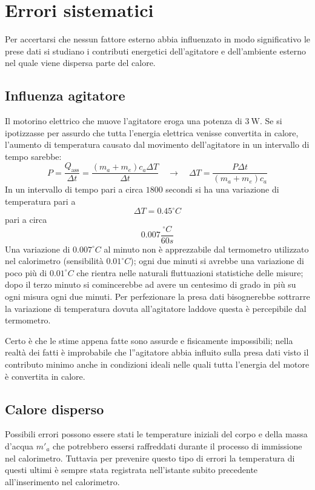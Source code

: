 \documentclass{article}
\begin{document}
	
	
	
	
	\section{Errori sistematici}
	Per accertarsi che nessun fattore esterno abbia influenzato in modo significativo le prese dati si studiano i contributi energetici dell'agitatore e dell'ambiente esterno nel quale viene dispersa parte del calore.
	
	\subsection{Influenza agitatore}
	
	
	Il motorino elettrico che muove l'agitatore eroga una potenza di \(\SI{3}{\watt}\). Se si ipotizzasse per assurdo che tutta l’energia elettrica venisse convertita in calore, l'aumento di temperatura causato dal movimento dell’agitatore in un intervallo di tempo sarebbe:
	\[ 
	P = \frac{Q_{\text{ass}}}{\Delta t} = \frac{(m_{a} + m_{e})c_{a}\Delta T}{\Delta t} \quad \to \quad \Delta T = \frac{P\Delta t}{(m_{a} + m_{e})c_{a}}
	\]
	In un intervallo di tempo pari a circa \(1800\) secondi si ha una variazione di temperatura pari a 
	\[ 
	\Delta T = 0.45 ^\circ C 
	\]
	pari a circa 
	\[
	0.007 \frac{^\circ C}{60 s}
	\]
	Una variazione di \(0.007 ^\circ C\) al minuto non è apprezzabile dal termometro utilizzato nel calorimetro (sensibilità \(0.01^\circ C\)); ogni due minuti si avrebbe una variazione di poco più di \(0.01^\circ C\) che rientra nelle naturali fluttuazioni statistiche delle misure; dopo il terzo minuto si comincerebbe ad avere un centesimo di grado in più su ogni misura ogni due minuti. Per perfezionare la presa dati bisognerebbe sottrarre la variazione di temperatura dovuta all'agitatore laddove questa è percepibile dal termometro.
	
	Certo è che le stime appena fatte sono assurde e fisicamente impossibili; nella realtà dei fatti è improbabile che l''agitatore abbia influito sulla presa dati visto il contributo minimo anche in condizioni ideali nelle quali tutta l'energia del motore è convertita in calore.
	
	
	\subsection{Calore disperso}
	Possibili errori possono essere stati le temperature iniziali del corpo e della massa d'acqua \(m'_a\) che potrebbero essersi raffreddati durante il processo di immissione nel calorimetro. Tuttavia per prevenire questo tipo di errori la temperatura di questi ultimi è sempre stata registrata nell'istante subito precedente all'inserimento nel calorimetro.
	
\end{document}
